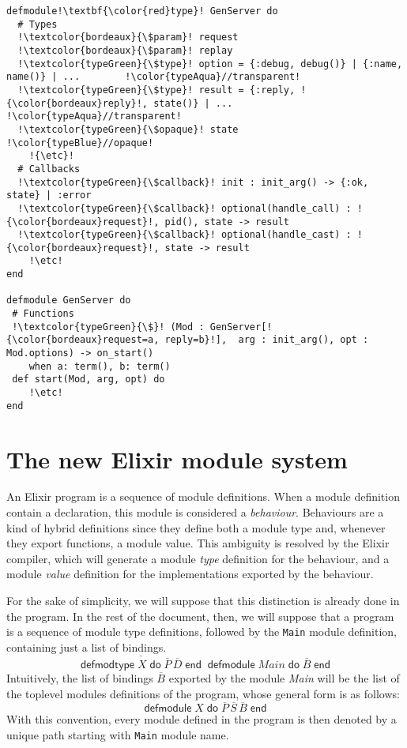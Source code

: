 \documentclass[a4paper,10pt]{article}
\DeclareMathOperator{\kwdefmt}{\textsf{defmodtype}}
\DeclareMathOperator{\kwend}{\textsf{end}}
\DeclareMathOperator{\kwdo}{\textsf{do}}
\DeclareMathOperator{\kwdefm}{\textsf{defmodule}}
\begin{document}
\begin{verbatim}
defmodule!\textbf{\color{red}type}! GenServer do
  # Types
  !\textcolor{bordeaux}{\$param}! request
  !\textcolor{bordeaux}{\$param}! replay
  !\textcolor{typeGreen}{\$type}! option = {:debug, debug()} | {:name, name()} | ...        !\color{typeAqua}//transparent!
  !\textcolor{typeGreen}{\$type}! result = {:reply, !{\color{bordeaux}reply}!, state()} | ...                   !\color{typeAqua}//transparent!
  !\textcolor{typeGreen}{\$opaque}! state                                                   !\color{typeBlue}//opaque!
    !{\etc}!
  # Callbacks
  !\textcolor{typeGreen}{\$callback}! init : init_arg() -> {:ok, state} | :error      
  !\textcolor{typeGreen}{\$callback}! optional(handle_call) : !{\color{bordeaux}request}!, pid(), state -> result
  !\textcolor{typeGreen}{\$callback}! optional(handle_cast) : !{\color{bordeaux}request}!, state -> result        
    !\etc!
end

defmodule GenServer do
 # Functions
 !\textcolor{typeGreen}{\$}! (Mod : GenServer[!{\color{bordeaux}request=a, reply=b}!],  arg : init_arg(), opt : Mod.options) -> on_start()
    when a: term(), b: term()
 def start(Mod, arg, opt) do
    !\etc!
end
\end{verbatim}


\section{The new Elixir module system}
An Elixir program is a sequence of module definitions. When a module definition contain a  declaration, this module is considered a \emph{behaviour}. Behaviours are a kind of hybrid definitions since they define both a module type and, whenever they export functions, a module value. This ambiguity is resolved by the Elixir compiler, which will generate a module \emph{type} definition for the behaviour, and a module \emph{value} definition for the implementations exported by the behaviour.

For the sake of simplicity, we will suppose that this distinction is already done in the program. In the rest of the document, then, we will suppose that a program is a sequence of module type definitions, followed by the \texttt{Main} module definition, containing just a list of bindings. 
\[\overline{\kwdefmt X \kwdo \overline{P}\, \overline{D} \kwend}\kwdefm \textit{Main} \kwdo \overline{B} \kwend\]
Intuitively, the list of bindings $\overline{B}$ exported by the module \textit{Main} will be the list of the toplevel modules definitions of the program, whose general form is as follows: 
\begin{equation}\label{eq:module}
\kwdefm X \kwdo \overline{P}\, \overline{S}\, \overline{B} \kwend
\end{equation}
With this convention, every module defined in the program is then denoted by a unique path starting with \texttt{Main} module name.
\end{document}

